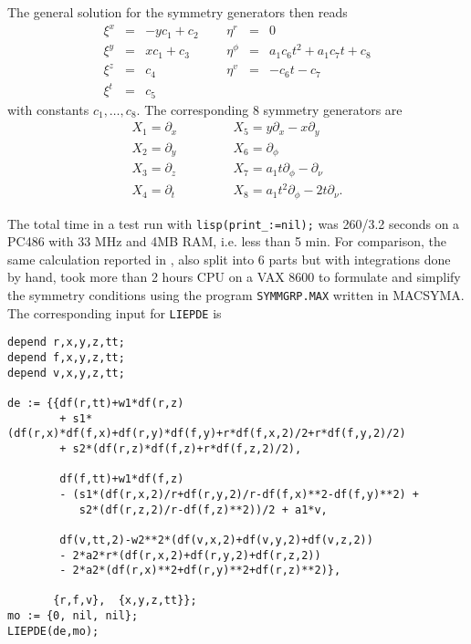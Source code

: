The general solution for the symmetry generators then reads
\[ \begin{array}{rclrcl}
 \xi^x & = & - y c_1 + c_2 \;\;\;\;\; &  \eta^r & = & 0  \\
 \xi^y & = & x c_1 + c_3  &  \eta^\phi & = & a_1 c_6 t^2 + a_1 c_7 t + c_8  \\
 \xi^z & = & c_4      &  \eta^v & = & - c_6 t - c_7     \\
 \xi^t & = & c_5  & & &
\end{array}
\]
with constants $c_1, \ldots, c_8.$ The corresponding 8 symmetry generators are
\begin{eqnarray*}
 X_1 = \partial_x & \;\;\;\;\;\;\;\;\;\; & X_5 = y\partial_x - x\partial_y \\
 X_2 = \partial_y & &  X_6 = \partial_\phi               \\
 X_3 = \partial_z & & X_7 = a_1t\partial_\phi - \partial_\nu \\
 X_4 = \partial_t & & X_8 = a_1t^2\partial_\phi - 2t\partial_\nu.
\end{eqnarray*}

The total time in a test run with {\tt lisp(print\_:=nil);} was
260/3.2 seconds on a PC486 with 33 MHz and 4MB RAM,
i.e. less than 5 min.
For comparison, the same calculation reported in \cite{Cham}, also split
into 6 parts but with integrations done by hand, took more than 2 hours CPU 
on a VAX 8600 to formulate and simplify the symmetry conditions using the
program {\tt SYMMGRP.MAX} written in MACSYMA.
The corresponding input for {\tt LIEPDE} is
\begin{verbatim}
depend r,x,y,z,tt;
depend f,x,y,z,tt;
depend v,x,y,z,tt;

de := {{df(r,tt)+w1*df(r,z)
        + s1*(df(r,x)*df(f,x)+df(r,y)*df(f,y)+r*df(f,x,2)/2+r*df(f,y,2)/2)
        + s2*(df(r,z)*df(f,z)+r*df(f,z,2)/2),

        df(f,tt)+w1*df(f,z)
        - (s1*(df(r,x,2)/r+df(r,y,2)/r-df(f,x)**2-df(f,y)**2) +
           s2*(df(r,z,2)/r-df(f,z)**2))/2 + a1*v,

        df(v,tt,2)-w2**2*(df(v,x,2)+df(v,y,2)+df(v,z,2))
        - 2*a2*r*(df(r,x,2)+df(r,y,2)+df(r,z,2))
        - 2*a2*(df(r,x)**2+df(r,y)**2+df(r,z)**2)},

       {r,f,v},  {x,y,z,tt}};
mo := {0, nil, nil};
LIEPDE(de,mo);
\end{verbatim}

